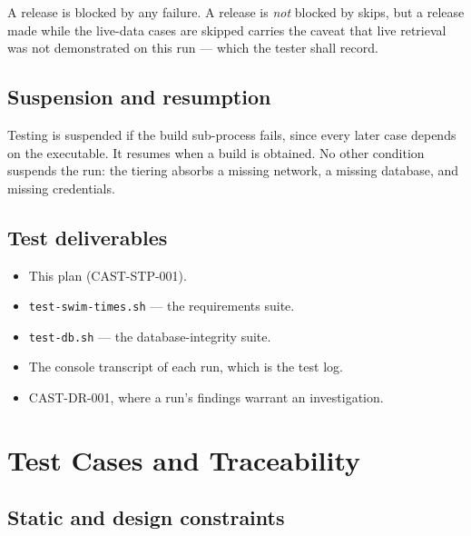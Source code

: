 \documentclass[12pt]{article}
\newcommand{\code}[1]{\texttt{#1}}
\begin{document}
\noindent A release is blocked by any failure.  A release is
\emph{not} blocked by skips, but a release made while the live-data
cases are skipped carries the caveat that live retrieval was not
demonstrated on this run --- which the tester shall record.

\subsection{Suspension and resumption}

Testing is suspended if the build sub-process fails, since every later
case depends on the executable.  It resumes when a build is obtained.
No other condition suspends the run: the tiering absorbs a missing
network, a missing database, and missing credentials.

\subsection{Test deliverables}

\begin{itemize}
  \item This plan (CAST-STP-001).
  \item \code{test-swim-times.sh} --- the requirements suite.
  \item \code{test-db.sh} --- the database-integrity suite.
  \item The console transcript of each run, which is the test log.
  \item CAST-DR-001, where a run's findings warrant an investigation.
\end{itemize}

\section{Test Cases and Traceability}\label{sec:cases}

\subsection{Static and design constraints}
\end{document}
